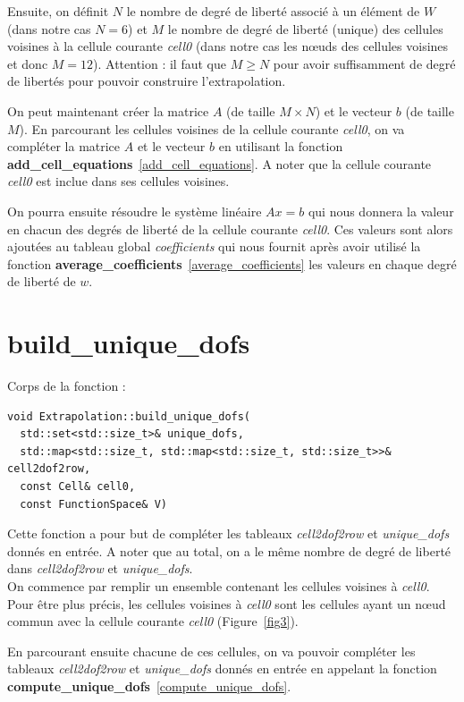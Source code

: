 \documentclass[french]{article}
\begin{document}
	Ensuite, on définit $N$ le nombre de degré de liberté associé à un élément de $W$ (dans notre cas $N=6$) et $M$ le nombre de degré de liberté (unique) des cellules voisines à la cellule courante \textit{cell0} (dans notre cas les nœuds des cellules voisines et donc $M=12$). Attention : il faut que $M\ge N$ pour avoir suffisamment de degré de libertés pour pouvoir construire l'extrapolation.
	
	On peut maintenant créer la matrice $A$ (de taille $M\times N$) et le vecteur $b$ (de taille $M$). En parcourant les cellules voisines de la cellule courante \textit{cell0}, on va compléter la matrice $A$ et le vecteur $b$ en utilisant la fonction \textbf{add\_cell\_equations}~\ref{add_cell_equations}. A noter que la cellule courante \textit{cell0} est inclue dans ses cellules voisines.
	
	On pourra ensuite résoudre le système linéaire $Ax=b$ qui nous donnera la valeur en chacun des degrés de liberté de la cellule courante \textit{cell0}. Ces valeurs sont alors ajoutées au tableau global \textit{coefficients} qui nous fournit après avoir utilisé la fonction \textbf{average\_coefficients}~\ref{average_coefficients} les valeurs en chaque degré de liberté de $w$.
	
	\section{build\_unique\_dofs}
	\label{build_unique_dofs}
	
	Corps de la fonction :
	
	\begin{lstlisting}
void Extrapolation::build_unique_dofs(
  std::set<std::size_t>& unique_dofs,
  std::map<std::size_t, std::map<std::size_t, std::size_t>>& cell2dof2row,
  const Cell& cell0,
  const FunctionSpace& V)
	\end{lstlisting}

	Cette fonction a pour but de compléter les tableaux \textit{cell2dof2row} et \textit{unique\_dofs} donnés en entrée. A noter que au total, on a le même nombre de degré de liberté dans \textit{cell2dof2row} et \textit{unique\_dofs}.\\
	
	On commence par remplir un ensemble contenant les cellules voisines à \textit{cell0}. Pour être plus précis, les cellules voisines à \textit{cell0} sont les cellules ayant un nœud commun avec la cellule courante \textit{cell0} (Figure~\ref{fig3}).
	
	En parcourant ensuite chacune de ces cellules, on va pouvoir compléter les tableaux \textit{cell2dof2row} et \textit{unique\_dofs} donnés en entrée en appelant la fonction \textbf{compute\_unique\_dofs}~\ref{compute_unique_dofs}. 
	
\end{document}

